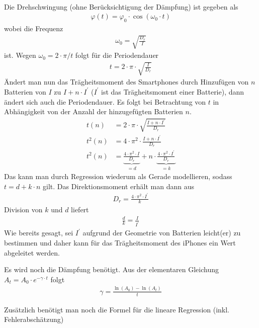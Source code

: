 \documentclass{article}
\begin{document}
~

Die Drehschwingung (ohne Berücksichtigung der Dämpfung) ist gegeben als
\begin{align}
\varphi(t) = \varphi_0 \cdot \cos(\omega_0 \cdot t)
\end{align}
wobei die Frequenz 
\begin{align}
\label{eq:kennfreq}
\omega_0 = \sqrt{\frac{D_r}{I}}
\end{align}
ist. Wegen $\omega_0 = 2\cdot \pi / t$ folgt für die Periodendauer
\begin{align*}
t = 2\cdot \pi \cdot \sqrt{\frac{I}{D_r}}
\end{align*}
Ändert man nun das Trägheitsmoment des Smartphones durch Hinzufügen von $n$ Batterien von $I$ zu $I + n\cdot I^\prime$ ($I^\prime$ ist das Trägheitsmoment einer Batterie), dann ändert sich auch die Periodendauer. Es folgt bei Betrachtung von $t$ in Abhängigkeit von der Anzahl der hinzugefügten Batterien $n$.
\begin{align*}
t(n) &= 2\cdot \pi \cdot \sqrt{\frac{I + n\cdot I^\prime}{D_r}} \\
t^2(n) &= 4\cdot \pi^2 \cdot \frac{I + n\cdot I^\prime}{D_r} \\
t^2(n) &= \underbrace{\frac{4\cdot \pi^2 \cdot I}{D_r}}_{=d} + n\cdot \underbrace{\frac{4\cdot\pi^2 \cdot I^\prime}{D_r}}_{=k}
\end{align*}
Das kann man durch Regression wiederum als Gerade modellieren, sodass $t = d + k\cdot n$ gilt. Das Direktionsmoment erhält man dann aus
\begin{align}
D_r = \frac{4\cdot\pi^2\cdot I^\prime}{k}
\end{align}
Division von $k$ und $d$ liefert
\begin{align}
\frac{d}{k} = \frac{I}{I^\prime}
\end{align}
Wie bereits gesagt, sei $I^\prime$ aufgrund der Geometrie von Batterien leicht(er) zu bestimmen und daher kann für das Trägheitsmoment des iPhones ein Wert abgeleitet werden.

Es wird noch die Dämpfung benötigt. Aus der elementaren Gleichung $A_t = A_0\cdot e^{-\gamma\cdot t}$ folgt
\begin{align}
\gamma = \frac{\ln(A_0) - \ln(A_t)}{t}
\end{align}


Zusätzlich benötigt man noch die Formel für die lineare Regression (inkl. Fehlerabschätzung)



\end{document}
